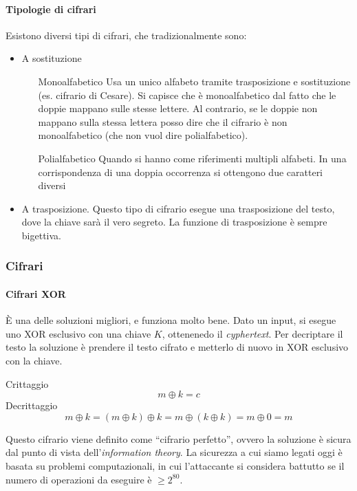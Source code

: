 \paragraph*{Tipologie di cifrari} Esistono diversi tipi di cifrari, che 
tradizionalmente sono:
\begin{itemize}
 \item A sostituzione
 \begin{itemize}
  \item[Monoalfabetico] Usa un unico alfabeto tramite trasposizione e 
sostituzione (es. cifrario di 
Cesare). Si capisce che è monoalfabetico dal fatto che le doppie mappano sulle 
stesse lettere.
Al contrario, se le doppie non mappano sulla stessa lettera posso dire che il 
cifrario è non monoalfabetico (che non vuol dire polialfabetico).

  \item[Polialfabetico] Quando si hanno come riferimenti multipli alfabeti.
 In una corrispondenza di una doppia occorrenza si ottengono due caratteri 
diversi
 \end{itemize}
 \item A trasposizione. Questo tipo di cifrario esegue una trasposizione del 
testo, dove la chiave sarà il vero segreto. La funzione di trasposizione è 
sempre bigettiva. 
\end{itemize}

\subsubsection{Cifrari}

\paragraph{Cifrari XOR}

È una delle soluzioni migliori, e funziona molto bene. Dato un input, si esegue 
uno XOR esclusivo con una chiave $K$, ottenenedo il \textit{cyphertext}. Per 
decriptare il testo la soluzione è prendere il testo cifrato e metterlo di nuovo 
in XOR esclusivo con la chiave.

Crittaggio
$$
m \oplus k = c
$$
\indent Decrittaggio
$$
m \oplus k = (m \oplus k) \oplus k = m \oplus (k \oplus k) = m \oplus 0 = m
$$

Questo cifrario viene definito come ``cifrario perfetto'', ovvero la soluzione è 
sicura dal punto di vista dell'\textit{information theory}. La sicurezza a cui 
siamo legati oggi è basata su problemi computazionali, in cui l'attaccante si 
considera battutto se il numero di operazioni da eseguire è $\ge 2^{80}$.

